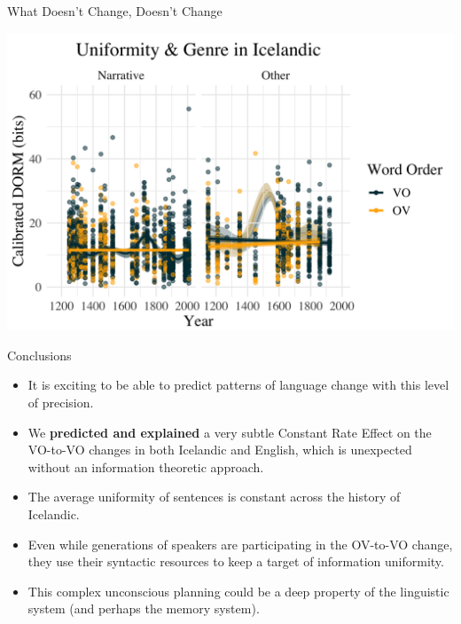 \documentclass[hyperref={pdfpagelabels=false}]{beamer}
\begin{document}
\begin{frame}{What Doesn't Change, Doesn't Change} 
	
	
		\includegraphics[scale = 0.2]{IcelandicGenreOutlierBehind.png}
	
\end{frame}


\begin{frame}{Conclusions} 
	
	
	\begin{itemize}
		\item It is exciting to be able to predict patterns of language change with this level of precision.\pause
		\item We \textbf{predicted and explained} a very subtle Constant Rate Effect on the VO-to-VO changes in both Icelandic and English, which is unexpected without an information theoretic approach.\pause
		\item The average uniformity of sentences is constant across the history of Icelandic.\pause
		\item Even while generations of speakers are participating in the OV-to-VO change, they use their syntactic resources to keep a target of information uniformity.\pause
		\item This complex unconscious planning could be a deep property of the linguistic system (and perhaps the memory system).
	\end{itemize}
	
\end{frame}
\end{document}
